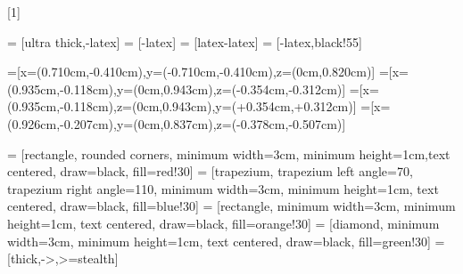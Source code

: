 \usepackage{pgfplots}
\usetikzlibrary{spy} %
\usetikzlibrary{shapes.misc}

\usetikzlibrary{patterns}
\usetikzlibrary{spy}
\usetikzlibrary{calc}
\usetikzlibrary{shapes.geometric, arrows}
\usetikzlibrary{matrix}
\usetikzlibrary{arrows,patterns}
\usepackage{environ}
\makeatletter
\newsavebox{\measure@tikzpicture}
[1]{%
    \def\tikz@width{#1}%
    \def\tikzscale{1}\begin{lrbox}{\measure@tikzpicture}%
        \BODY
    \end{lrbox}%
    \edef\tikzscale{\pgfmathresult}%
    \BODY
}
\makeatother
\pgfplotsset{
    colormap name=jet
}
\pgfplotsset{compat=newest}

\usepackage{tikz}

\usetikzlibrary{external}
\tikzexternalize[prefix=tikz/]


\newcommand{\tikzsetnextfilenamesafe}[1]{
  \StrSubstitute{#1}{/}{-}[\temp]
  \tikzsetnextfilename{\temp}
}
\usetikzlibrary{matrix}
\pgfplotsset{compat=newest}


   = [ultra thick,-latex]
 = [-latex]
    = [latex-latex]
   = [-latex,black!55]

=[x={(0.710cm,-0.410cm)},y={(-0.710cm,-0.410cm)},z={(0cm,0.820cm)}]
 =[x={(0.935cm,-0.118cm)},y={(0cm,0.943cm)},z={(-0.354cm,-0.312cm)}]
=[x={(0.935cm,-0.118cm)},z={(0cm,0.943cm)},y={(+0.354cm,+0.312cm)}]
=[x={(0.926cm,-0.207cm)},y={(0cm,0.837cm)},z={(-0.378cm,-0.507cm)}]

 = [rectangle, rounded corners, minimum width=3cm, minimum height=1cm,text centered, draw=black, fill=red!30]
 = [trapezium, trapezium left angle=70, trapezium right angle=110, minimum width=3cm, minimum height=1cm, text centered, draw=black, fill=blue!30]
 = [rectangle, minimum width=3cm, minimum height=1cm, text centered, draw=black, fill=orange!30]
 = [diamond, minimum width=3cm, minimum height=1cm, text centered, draw=black, fill=green!30]
 = [thick,->,>=stealth]

